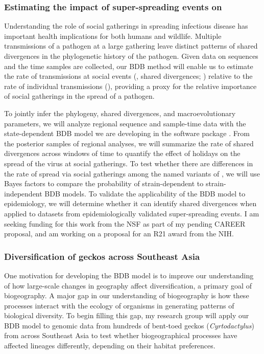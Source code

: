\subsubsection*{Estimating the impact of super-spreading events on \covid}
Understanding the role of social gatherings in spreading infectious disease
has important health implications for both humans and wildlife.
Multiple transmissions of a pathogen at a large gathering leave distinct
patterns of shared divergences in the phylogenetic history of the pathogen.
Given data on sequences and the time samples are collected, our BDB method will
enable us to estimate the rate of transmissions at social events (\ie, shared
divergences; \burstrate) relative to the rate of individual transmissions
(\speciationrate),
providing a proxy for the relative importance of social gatherings
in the spread of a pathogen.

To jointly infer the \sarscov phylogeny, shared divergences,
and macroevolutionary parameters,
we will analyze regional sequence and sample-time data with the
state-dependent BDB model we are developing in the software package \revbayes.
From the posterior samples of regional analyses, we will summarize the rate of
shared divergences across windows of time to quantify the effect of holidays
on the spread of the virus at social gatherings.
To test whether there are differences in the rate of spread via social
gatherings among the named variants of \sarscov,
we will use Bayes factors to compare the probability of strain-dependent to
strain-independent BDB models.
To validate the applicability of the BDB model to epidemiology,
we will determine whether it can identify shared divergences when applied to
\sarscov datasets from epidemiologically validated super-spreading events.
I am seeking funding for this work from the NSF as part of my pending CAREER
proposal, and am working on a proposal for an R21 award from the NIH.


\subsubsection*{Diversification of geckos across Southeast Asia}
One motivation for developing the BDB model is to improve our understanding of
how large-scale changes in geography affect diversification, a primary goal of
biogeography.
A major gap in our understanding of biogeography is how these processes
interact with the ecology of organisms in generating patterns of biological
diversity.
To begin filling this gap,
my research group will
apply our BDB model to genomic data from
hundreds of bent-toed geckos (\textit{Cyrtodactylus}) from
across Southeast Asia
to test whether
biogeographical processes
have affected lineages differently, depending on their habitat preferences.

